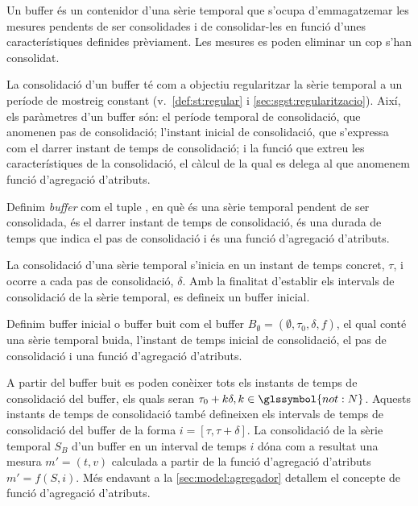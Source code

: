 Un buffer és un contenidor d'una sèrie temporal que s'ocupa
d'emmagatzemar les mesures pendents de ser consolidades i de
consolidar-les en funció d'unes característiques definides
prèviament. Les mesures es poden eliminar un cop s'han consolidat.

La consolidació d'un buffer té com a objectiu regularitzar la sèrie
temporal a un període de mostreig constant
(v.~\autoref{def:st:regular} i \autoref{sec:sgst:regularitzacio}).
Així, els paràmetres d'un buffer són: el període temporal de
consolidació, que anomenen pas de consolidació; l'instant inicial de
consolidació, que s'expressa com el darrer instant de temps de
consolidació; i la funció que extreu les
característiques de la consolidació, el càlcul de la qual es delega al
que anomenem funció d'agregació d'atributs.


\begin{definition}[Buffer]
  Definim \emph{buffer} com el tuple
  , en què
   és una sèrie temporal pendent de
  ser consolidada,  és el darrer
  instant de temps de consolidació,
   és una durada de temps que
  indica el pas de consolidació i  és una
  funció d'agregació d'atributs.
\end{definition}

La consolidació d'una sèrie temporal s'inicia en un instant de temps
concret, $\tau$, i ocorre a cada pas de consolidació, $\delta$. Amb la
finalitat d'establir els intervals de consolidació de la sèrie
temporal, es defineix un buffer inicial.

\begin{definition}\label{def:model:buffer_buit}
  Definim buffer inicial o buffer buit com el buffer $B_{\emptyset} =
  (\emptyset,\tau_0, \delta, f)$, el qual conté una sèrie temporal
  buida, l'instant de temps inicial de consolidació, el pas de
  consolidació i una funció d'agregació d'atributs.
\end{definition}

A partir del buffer buit es poden conèixer tots els instants de temps
de consolidació del buffer, els quals seran $\tau_0+k\delta,
k\in\glssymbol{not:N}$. Aquests instants de temps de consolidació
també defineixen els intervals de temps de consolidació del buffer de
la forma $i=[\tau,\tau+\delta]$. La consolidació de la sèrie temporal
$S_B$ d'un buffer en un interval de temps $i$ dóna com a resultat una
mesura $m'=(t,v)$ calculada a partir de la funció d'agregació
d'atributs $m' = f (S, i)$. Més endavant a la
\autoref{sec:model:agregador} detallem el concepte de funció
d'agregació d'atributs.


